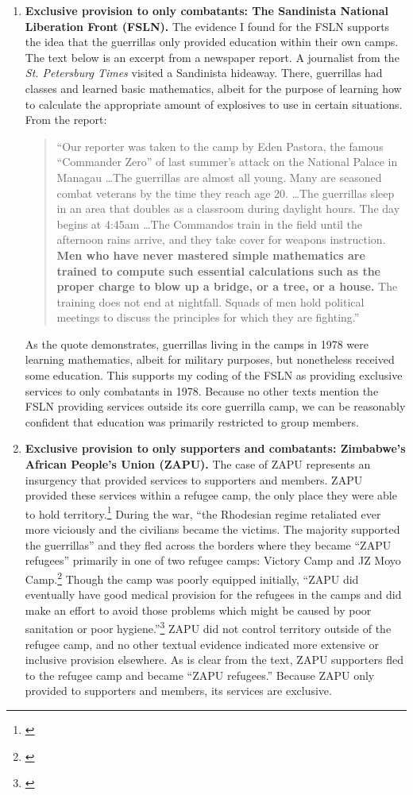 \documentclass[12pt, letterpaper]{article}
\begin{document}
\begin{enumerate}
\item \textbf{Exclusive provision to only combatants: The Sandinista National Liberation Front (FSLN).} The evidence I found for the FSLN supports the idea that the guerrillas only provided education within their own camps. The text below is an excerpt from a newspaper report. A journalist from the \textit{St. Petersburg Times} visited a Sandinista hideaway. There, guerrillas had classes and learned basic mathematics, albeit for the purpose of learning how to calculate the appropriate amount of explosives to use in certain situations. From the report: 
\begin{quote}
``Our reporter was taken to the camp by Eden Pastora, the famous ``Commander Zero'' of last summer's attack on the National Palace in Managau \ldots The guerrillas are almost all young. Many are seasoned combat veterans by the time they reach age 20. \ldots The guerrillas sleep in an area that doubles as a classroom during daylight hours. The day begins at 4:45am \ldots The Commandos train in the field until the afternoon rains arrive, and they take cover for weapons instruction. \textbf{Men who have never mastered simple mathematics are trained to compute such essential calculations such as the proper charge to blow up a bridge, or a tree, or a house.} The training does not end at nightfall. Squads of men hold political meetings to discuss the principles for which they are fighting.''
\end{quote} 
As the quote demonstrates, guerrillas living in the camps in 1978 were learning mathematics, albeit for military purposes, but nonetheless received some education. This supports my coding of the FSLN as providing exclusive services to only combatants in 1978. Because no other texts mention the FSLN providing services outside its core guerrilla camp, we can be reasonably confident that education was primarily restricted to group members. 
\item \textbf{Exclusive provision to only supporters and combatants: Zimbabwe's African People's Union (ZAPU).} The case of ZAPU represents an insurgency that provided services to supporters and members. ZAPU provided these services within a refugee camp, the only place they were able to hold territory.\footnote{\citealt{cunningham2009takes}} During the war, ``the Rhodesian regime retaliated ever more viciously and the civilians became the victims. The majority supported the guerrillas'' and they fled across the borders where they became ``ZAPU refugees'' primarily in one of two refugee camps: Victory Camp and JZ Moyo Camp.\footnote{\citealt{zapuweb}} Though the camp was poorly equipped initially, ``ZAPU did eventually have good medical provision for the refugees in the camps and did make an effort to avoid those problems which might be caused by poor sanitation or poor hygiene.''\footnote{\citealt{zapuweb}} ZAPU did not control territory outside of the refugee camp, and no other textual evidence indicated more extensive or inclusive provision elsewhere. As is clear from the text, ZAPU supporters fled to the refugee camp and became ``ZAPU refugees.'' Because ZAPU only provided to supporters and members, its services are exclusive.

\end{enumerate}
\end{document}
